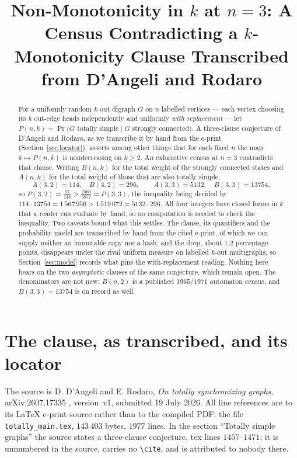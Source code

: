 \documentclass[11pt]{amsart}
\title[Non-monotonicity in $k$ at $n=3$]
{Non-Monotonicity in $k$ at $n=3$: A Census Contradicting a $k$-Monotonicity
Clause Transcribed from D'Angeli and Rodaro}
\date{}
\theoremstyle{remark}
\begin{document}
\sloppy

\begin{abstract}
For a uniformly random $k$-out digraph $G$ on $n$ labelled vertices --- each vertex
choosing its $k$ out-edge heads independently and uniformly \emph{with replacement} ---
let
$P(n,k)=\Pr\bigl(G \text{ totally simple}\mid G \text{ strongly connected}\bigr)$.
A three-clause conjecture of D'Angeli and Rodaro, as we transcribe it by hand from the
e-print (Section~\ref{sec:locator}), asserts among other things that for each fixed $n$ the
map $k\mapsto P(n,k)$ is nondecreasing on $k\ge2$.  An exhaustive census at $n=3$
contradicts that clause.  Writing $B(n,k)$ for the total weight of the strongly connected states
and $A(n,k)$ for the total weight of those that are also totally simple,
\[
  A(3,2)=114,\quad B(3,2)=296,\qquad A(3,3)=5132,\quad B(3,3)=13754,
\]
so $P(3,2)=\tfrac{57}{148}>\tfrac{2566}{6877}=P(3,3)$, the inequality being decided by
$114\cdot13754=1\,567\,956>1\,519\,072=5132\cdot296$.  All four integers have closed forms
in $k$ that a reader can evaluate by hand, so no computation is needed to check the
inequality.  Two caveats bound what this settles.  The clause, its quantifiers and the
probability model are transcribed by hand from the cited e-print, of which we can supply
neither an immutable copy nor a hash; and the drop, about $1.2$ percentage points,
disappears under the rival uniform measure on labelled $k$-out multigraphs, so
Section~\ref{sec:model} records what pins the with-replacement reading.  Nothing here bears
on the two \emph{asymptotic} clauses of the same conjecture, which remain open.  The
denominators are not new: $B(n,2)$ is a published $1965$/$1971$ automaton census, and
$B(3,3)=13754$ is on record as well.
\end{abstract}

\maketitle

\section{The clause, as transcribed, and its locator}
\label{sec:locator}

The source is D. D'Angeli and E. Rodaro, \emph{On totally synchronizing graphs},
arXiv:2607.17335 \cite{DR}, version~v1, submitted 19 July 2026.  All line references are to
its \LaTeX{} e-print source rather than to the compiled PDF: the file
\texttt{totally\_main.tex}, $143\,403$ bytes, $1977$ lines.  In the section ``Totally
simple graphs'' the source states a three-clause conjecture, tex lines $1457$--$1471$; it
is unnumbered in the source, carries no \verb|\cite|, and is attributed to nobody there.
\end{document}
